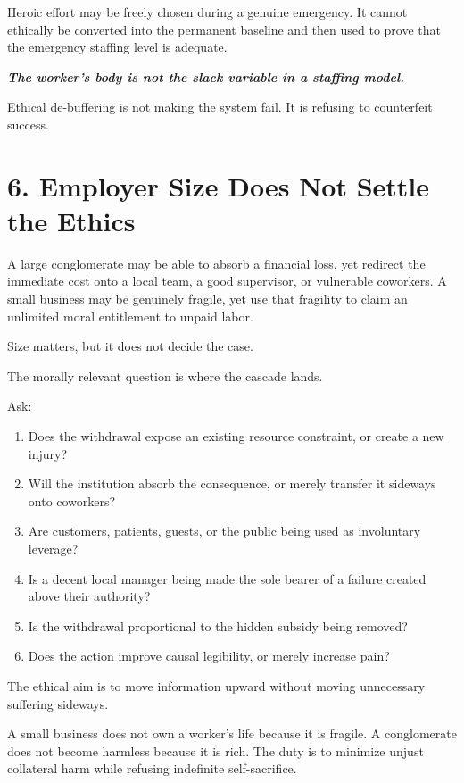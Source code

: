 \documentclass[11pt,oneside]{article}
\providecommand{\tightlist}{%
  \setlength{\itemsep}{0.22em}\setlength{\parskip}{0pt}}
\renewenvironment{quote}
  {\begin{tcolorbox}[
      enhanced,
      breakable,
      colback=ManifestLight,
      colframe=ManifestRule,
      boxrule=0pt,
      leftrule=3pt,
      arc=0pt,
      outer arc=0pt,
      left=10pt,right=10pt,top=8pt,bottom=8pt,
      before skip=0.8em,after skip=0.8em
    ]\itshape}
  {\end{tcolorbox}}
\begin{document}
Heroic effort may be freely chosen during a genuine emergency. It cannot ethically be converted into the permanent baseline and then used to prove that the emergency staffing level is adequate.

\begin{quote}
\textbf{The worker's body is not the slack variable in a staffing model.}
\end{quote}

Ethical de-buffering is not making the system fail. It is refusing to counterfeit success.

\section{6. Employer Size Does Not Settle the Ethics}\label{employer-size-does-not-settle-the-ethics}

A large conglomerate may be able to absorb a financial loss, yet redirect the immediate cost onto a local team, a good supervisor, or vulnerable coworkers. A small business may be genuinely fragile, yet use that fragility to claim an unlimited moral entitlement to unpaid labor.

Size matters, but it does not decide the case.

The morally relevant question is where the cascade lands.

Ask:

\begin{enumerate}
\def\labelenumi{\arabic{enumi}.}
\tightlist
\item
  Does the withdrawal expose an existing resource constraint, or create a new injury?
\item
  Will the institution absorb the consequence, or merely transfer it sideways onto coworkers?
\item
  Are customers, patients, guests, or the public being used as involuntary leverage?
\item
  Is a decent local manager being made the sole bearer of a failure created above their authority?
\item
  Is the withdrawal proportional to the hidden subsidy being removed?
\item
  Does the action improve causal legibility, or merely increase pain?
\end{enumerate}

The ethical aim is to move information upward without moving unnecessary suffering sideways.

A small business does not own a worker's life because it is fragile. A conglomerate does not become harmless because it is rich. The duty is to minimize unjust collateral harm while refusing indefinite self-sacrifice.
\end{document}
